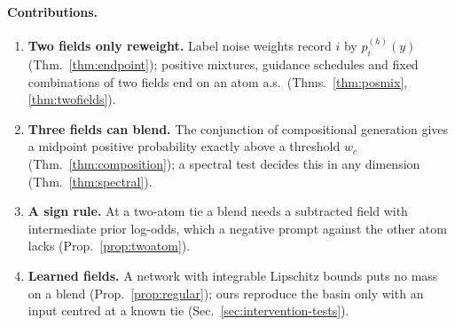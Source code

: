 \documentclass{article} %
\theoremstyle{plain}
\theoremstyle{definition}
\theoremstyle{remark}
\begin{document}
\paragraph{Contributions.}\nopagebreak[4]
\begin{enumerate}[leftmargin=1.5em,itemsep=1pt]
\item \textbf{Two fields only reweight.} Label noise weights record $i$ by $p_i^{(h)}(y)$
  (Thm.~\ref{thm:endpoint}); positive mixtures, guidance schedules and fixed combinations of two
  fields end on an atom a.s.\ (Thms.~\ref{thm:posmix}, \ref{thm:twofields}).
\item \textbf{Three fields can blend.} The conjunction of compositional generation gives a midpoint
  positive probability exactly above a threshold $w_c$ (Thm.~\ref{thm:composition}); a spectral test
  decides this in any dimension (Thm.~\ref{thm:spectral}).
\item \textbf{A sign rule.} At a two-atom tie a blend needs a subtracted field with intermediate
  prior log-odds, which a negative prompt against the other atom lacks (Prop.~\ref{prop:twoatom}).
\item \textbf{Learned fields.} A network with integrable Lipschitz bounds puts no mass on a blend
  (Prop.~\ref{prop:regular}); ours reproduce the basin only with an input centred at a known tie
  (Sec.~\ref{sec:intervention-tests}).
\end{enumerate}
\end{document}
